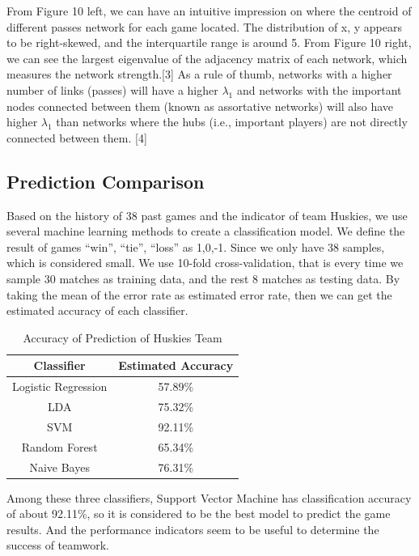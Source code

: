 \documentclass{mcmthesis}
\begin{document}
From Figure 10 left, we can have an intuitive impression on where the centroid of different passes network for each game located.  The distribution of x, y appears to be right-skewed, and the interquartile range is around 5. From Figure 10 right, we can see the largest eigenvalue of the adjacency matrix of each network, which measures the 
network strength.[3] As a rule of thumb, networks with a higher number of links (passes) will have a higher $\lambda_1$ and networks with the important nodes connected between them (known as assortative networks) will also have higher $\lambda_1$ than networks where the hubs (i.e., important players) are not directly connected between them. [4]

\subsection{Prediction Comparison}
Based on the history of 38 past games and the indicator of team Huskies, we use several machine learning methods to create a classification model. We define the result of games “win”, “tie”, “loss” as {1,0,-1}.  Since we only have 38 samples, which is considered small. We use 10-fold cross-validation, that is every time we sample 30 matches as training data, and the rest 8 matches as testing data. By taking the mean of the error rate as estimated error rate, then we can get the estimated accuracy of each classifier.

\begin{table}[thb]
\caption{Accuracy of Prediction of Huskies Team}
\begin{center}
\begin{tabular}{ c c}
\hline
Classifier&Estimated Accuracy\\
\hline
Logistic Regression& 57.89\%\\
LDA&75.32\%\\
SVM&92.11\%\\
Random Forest & 65.34\%\\
Naive Bayes & 76.31\%\\
\hline
\end{tabular}
\end{center}
\end{table}
Among these three classifiers, Support Vector Machine has classification accuracy of about 92.11\%, so it is considered to be the best model to predict the game results. And the performance indicators seem to be useful to determine the success of teamwork.
\end{document}
